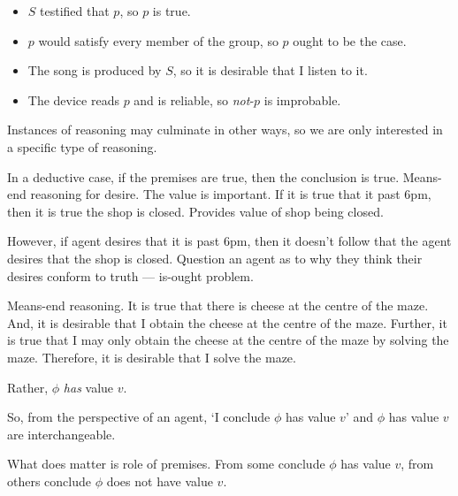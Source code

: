 \begin{note}
  \begin{itemize}
  \item \(S\) testified that \(p\), so \(p\) is true.
  \item \(p\) would satisfy every member of the group, so \(p\) ought to be the case.
  \item The song is produced by \(S\), so it is desirable that I listen to it.
  \item The device reads \(p\) and is reliable, so \emph{not}-\(p\) is improbable.
  \end{itemize}
\end{note}

\begin{note}
  Instances of reasoning may culminate in other ways, so we are only interested in a specific type of reasoning.
\end{note}

\begin{note}
  In a deductive case, if the premises are true, then the conclusion is true.
  Means-end reasoning for desire.
  The value is important.
  If it is true that it past 6pm, then it is true the shop is closed.
  Provides value of shop being closed.

  However, if agent desires that it is past 6pm, then it doesn't follow that the agent desires that the shop is closed.
  Question an agent as to why they think their desires conform to truth --- is-ought problem.

  Means-end reasoning.
  It is true that there is cheese at the centre of the maze.
  And, it is desirable that I obtain the cheese at the centre of the maze.
  Further, it is true that I may only obtain the cheese at the centre of the maze by solving the maze.
  Therefore, it is desirable that I solve the maze.
\end{note}

\begin{note}[`Concluding']
  Rather, \(\phi\) \emph{has} value \(v\).

  So, from the perspective of an agent, `I conclude \(\phi\) has value \(v\)' and \(\phi\) has value \(v\) are interchangeable.
\end{note}

\begin{note}
  What does matter is role of premises.
  From some conclude \(\phi\) has value \(v\), from others conclude \(\phi\) does not have value \(v\).
\end{note}

